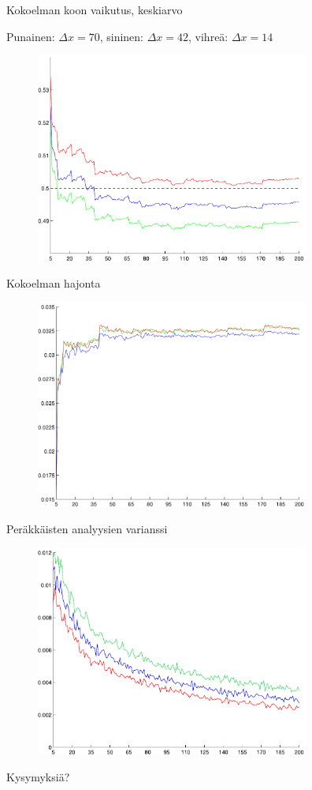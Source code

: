 \documentclass{beamer}
\begin{document}
\begin{frame}{Kokoelman koon vaikutus, keskiarvo}

Punainen: $\Delta x=70$, sininen: $\Delta x=42$, vihreä: $\Delta x=14$

\begin{figure}
\includegraphics[width=9cm]{mean_conv_2_6_10.pdf}
\end{figure}

\end{frame}

\begin{frame}{Kokoelman hajonta}

\begin{figure}
\includegraphics[width=9cm]{ensemble_stdev.pdf}
\end{figure}

\end{frame}

\begin{frame}{Peräkkäisten analyysien varianssi}

\begin{figure}
\includegraphics[width=9cm]{stdev_between_analysis.pdf}
\end{figure}

\end{frame}

\begin{frame}{Kysymyksiä?}


\end{frame}
\end{document}
